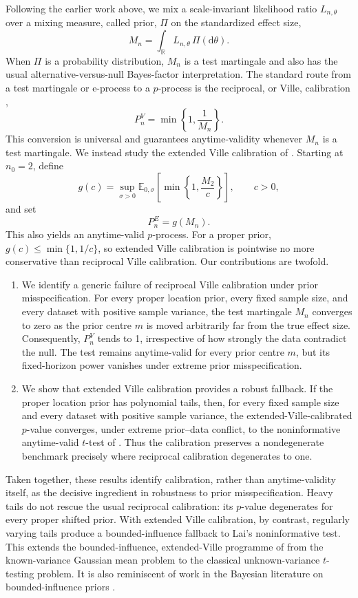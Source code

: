 Following the earlier work above, we mix a scale-invariant likelihood
ratio \(L_{n,\theta}\) over a mixing measure, called prior, \(\Pi\) on the standardized
effect size,
\[
  M_n
  =
  \int_{\mathbb R} L_{n,\theta}\,\Pi(\mathrm d\theta).
\]
When \(\Pi\) is a probability distribution, \(M_n\) is a test
martingale and also has the usual alternative-versus-null Bayes-factor
interpretation.  The standard route from a test martingale or e-process to a
\(p\)-process is the reciprocal, or Ville, calibration
\citep{Ville1939,Shafer2011,Ramdas2023},
\[
  P_n^{V}
  =
  \min\left\{1,\frac{1}{M_n}\right\}.
\]
This conversion is universal and guarantees anytime-validity whenever
\(M_n\) is a test martingale. We instead study the extended Ville
calibration of \citet{Wang2025a}. Starting at \(n_0=2\), define
\[
  g(c)
  =
  \sup_{\sigma>0}
  \mathbb E_{0,\sigma}
  \left[
    \min\left\{1,\frac{M_2}{c}\right\}
  \right],
  \qquad c>0,
\]
and set
\[
  P_n^{E}=g(M_n).
\]
This also yields an anytime-valid \(p\)-process. For a proper prior,
\(g(c)\leq\min\{1,1/c\}\), so extended Ville calibration is
pointwise no more conservative than reciprocal Ville calibration. Our contributions are twofold.
\begin{enumerate}
  \item We identify a generic failure of reciprocal Ville calibration
  under prior misspecification. For every proper location prior, every
  fixed sample size, and every dataset with positive sample variance,
  the test martingale \(M_{n}\) converges to zero as the prior centre
  \(m\) is moved arbitrarily far from the true effect size. Consequently,
  \(P_{n}^{V}\) tends to 1, irrespective of how strongly the data contradict
  the null. The test remains anytime-valid for every prior centre \(m\), but its
  fixed-horizon power vanishes under extreme prior misspecification. 

  \item We show that extended Ville calibration provides a robust
  fallback. If the proper location prior has polynomial tails,
  then, for every fixed sample size and every dataset with positive
  sample variance, the extended-Ville-calibrated \(p\)-value converges,
  under extreme prior--data conflict, to the noninformative
  anytime-valid \(t\)-test of \citet{Lai1976}. Thus the calibration
  preserves a nondegenerate benchmark precisely where reciprocal
  calibration degenerates to one.
\end{enumerate}

Taken together, these results identify calibration, rather than
anytime-validity itself, as the decisive ingredient in robustness to
prior misspecification. Heavy tails do not rescue the usual reciprocal
calibration: its \(p\)-value degenerates for every proper shifted prior.
With extended Ville calibration, by contrast, regularly varying tails
produce a bounded-influence fallback to Lai's noninformative test. This
extends the bounded-influence, extended-Ville programme of
\citet{Cortinovis2025} from the known-variance Gaussian mean problem to
the classical unknown-variance \(t\)-testing problem. It is also reminiscent of work in the Bayesian literature on bounded-influence priors \citep{Dawid1973,Pericchi1992,Pericchi1995}.

